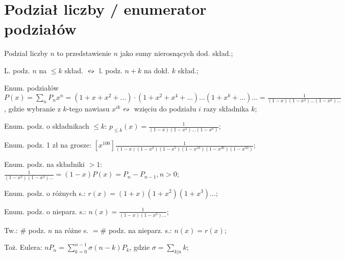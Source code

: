 \section{Podział liczby / enumerator podziałów}

Podział liczby $n$ to przedstawienie $n$ jako sumy nierosnących dod. skład.;

L. podz. $n$ na $\leq k$ skład. $\leftrightsquigarrow$
  l. podz. $n+k$ na dokł. $k$ skład.;

Enum. podziałów $P(x) = \sum_nP_nx^n =
  (1+x+x^2+\dots)\cdot(1+x^2+x^4+\dots)\dots(1+x^k+\dots)\dots =
  \frac{1}{(1-x)(1-x^2)\dots(1-x^k)\dots}$, gdzie wybranie z $k$-tego nawiasu
  $x^{ik} \leftrightsquigarrow$ wzięciu do podziału $i$ razy składnika $k$;

Enum. podz. o składnikach $\leq k$: $p_{\leq k} (x) =
  \frac{1}{(1-x)(1-x^2)\dots(1-x^k)}$;

Enum. podz. 1 zł na grosze:
  $\left [ x^{100} \right ]
  \frac{1}{(1-x)(1-x^2)(1-x^5)(1-x^{10})(1-x^{20})(1-x^{50})}$;

Enum. podz. na składniki $>1$: $\frac{1}{(1-x^2)(1-x^3)\dots}=(1-x)P(x) =
  P_n - P_{n-1}, n>0$;

Enum. podz. o różnych s.: $r(x) = (1+x)(1+x^2)(1+x^3)\dots$;

Enum. podz. o nieparz. s.: $n(x)=\frac{1}{(1-x)(1-x^3)\dots}$;

Tw.: $\#$ podz. $n$ na różne s. $= \#$ podz. na nieparz. s.: $n(x) = r(x)$;

Toż. Eulera: $nP_n = \sum_{k=0}^{n-1}\sigma(n-k)P_k$,
  gdzie $\sigma = \sum_{k|n}k$;
